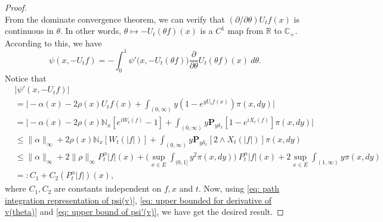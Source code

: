 \documentclass[12pt,a4paper]{amsart}
\theoremstyle{plain}
\theoremstyle{definition}
\numberwithin{equation}{section}
\begin{document}
\begin{proof}
\begin{equation}
\end{equation}
    From the dominate convergence theorem, we can verify that $(\partial/\partial \theta)U_tf(x)$ is continuous in $\theta$.
    In other words, $\theta \mapsto -U_t(\theta f)(x)$ is a $C^1$ map from $\mathbb R$ to $\mathbb C_+$.
    According to this, we have
\begin{equation}
\label{eq: path integration representation of psi(v)}
    \psi(x,-U_tf) = -\int_0^1 \psi'\big(x,-U_t(\theta f)\big) \frac{\partial}{\partial \theta} U_t(\theta f)(x)~d\theta.
\end{equation}
    Notice that
\begin{equation}
\label{eq: upper bound of psi'(v)}
\begin{split}
    &|\psi'(x, -U_tf)|
    \\&= \Big| -\alpha(x)- 2\rho(x) U_tf(x)+ \int_{(0,\infty)} y (1- e^{y U_tf(x)} ) \pi(x,dy)\Big|
    \\&= \Big| - \alpha(x)- 2\rho(x)\mathbb N_x[e^{i W_{t}(f)} - 1]  + \int_{(0,\infty)} y \mathbf P_{y \delta_x}[1-e^{i X_{t}(f)}] \pi(x,dy) \Big|
\\ &\leq \|\alpha\|_\infty + 2\rho(x)\mathbb N_x[W_t(|f|)]+ \int_{(0,\infty)} y\mathbf P_{y\delta_x}[2\wedge X_t(|f|)] \pi(x,dy)
\\ &\leq \|\alpha\|_\infty + 2\|\rho\|_\infty 
P^\alpha_t |f|(x) + \Big(\sup_{x\in E}\int_{(0,1]}y^2 \pi(x,dy)\Big)~P^\alpha_t |f|(x)
  + 2\sup_{x\in E}\int_{(1,\infty)} y \pi(x,dy)
\\ &=: C_1 + C_2(P^\alpha_t |f|)(x),
\end{split}
\end{equation}
    where $C_1, C_2$ are constants independent on $f,x$ and $t$.
    Now, using \eqref{eq: path integration representation of psi(v)}, \eqref{eq: upper bounded for derivative of v(theta)} and \eqref{eq: upper bound of psi'(v)}, we have get the desired result.
\end{proof}
\end{document}

